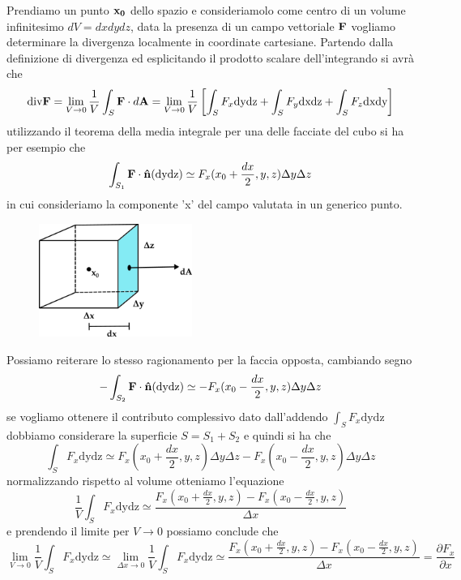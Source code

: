 Prendiamo un punto $\bold{x_0}$ dello spazio e consideriamolo come centro di un volume infinitesimo $dV=dxdydz$, data la presenza di un campo vettoriale $\bold{F}$ vogliamo determinare la divergenza localmente in coordinate cartesiane. Partendo dalla definizione di divergenza ed esplicitando il prodotto scalare dell'integrando si avr\`a che 
\begin{equation*}
 \text{div}\bold{F} =  \lim_{V \to 0} \frac{1}{V} \int_{S} \bold{F} \cdot d\bold{A} = \lim_{V \to 0 } \frac{1}{V} \left [ \int_{S} F_{x}\text{dydz} + \int_{S} F_y \text{dxdz} + \int_{S} F_z \text{dxdy}\right ]
	 \end{equation*}
utilizzando il teorema della media integrale per una delle facciate del cubo si ha per esempio che 
\begin{equation*}
	\int_{S_1}\bold{F}\cdot \bold{\hat{n}}(\text{dydz}) \simeq F_x(x_0+\frac{dx}{2},y,z)\Delta y \Delta z
\end{equation*}
in cui consideriamo la componente 'x' del campo valutata in un generico punto. 
 
\begin{figure}[ht]
\vspace{0.1in}
\includegraphics[width = 5cm]{images/cube}	
\centering
\vspace{0.1in}
\end{figure}
Possiamo reiterare lo stesso ragionamento per la faccia opposta, cambiando segno
\begin{equation*}
	-\int_{S_2}\bold{F}\cdot \bold{\hat{n}}(\text{dydz}) \simeq -F_x(x_0-\frac{dx}{2},y,z)\Delta y \Delta z
\end{equation*}
se vogliamo ottenere il contributo complessivo dato dall'addendo $\int_{S} F_{x}\text{dydz}$ dobbiamo considerare la superficie $S = S_1+S_2$ e quindi si ha che 
\begin{equation*}
	\int_{S} F_{x}\text{dydz} \simeq F_x(x_0+\frac{dx}{2},y,z)\Delta y \Delta z -F_x(x_0-\frac{dx}{2},y,z)\Delta y \Delta z
\end{equation*}
normalizzando rispetto al volume otteniamo l'equazione 
\begin{equation*}
	\frac{1}{V}\int_{S} F_{x}\text{dydz} \simeq \frac{F_x(x_0+\frac{dx}{2},y,z)-F_x(x_0-\frac{dx}{2},y,z)}{\Delta x}
\end{equation*}
e prendendo il limite per $V \to 0$ possiamo conclude che 
\begin{equation*}
	\lim_{V \to 0} \frac{1}{V}\int_{S} F_{x}\text{dydz} \simeq \lim_{\Delta x  \to 0} \frac{1}{V}\int_{S} F_{x}\text{dydz} \simeq \frac{F_x(x_0+\frac{dx}{2},y,z)-F_x(x_0-\frac{dx}{2},y,z)}{\Delta x} = \frac{\partial F_{x}}{\partial x }
\end{equation*}

